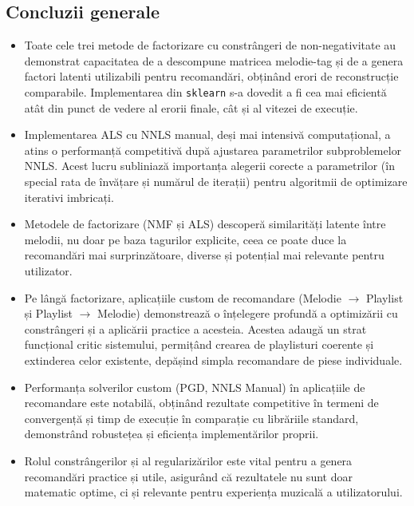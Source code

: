 \documentclass[12pt,a4paper]{article}
\begin{document}
	\subsection{Concluzii generale}
	\begin{itemize}
		\item Toate cele trei metode de factorizare cu constrângeri de non-negativitate au demonstrat capacitatea de a descompune matricea melodie-tag și de a genera factori latenti utilizabili pentru recomandări, obținând erori de reconstrucție comparabile. Implementarea din \texttt{sklearn} s-a dovedit a fi cea mai eficientă atât din punct de vedere al erorii finale, cât și al vitezei de execuție.
		\item Implementarea ALS cu NNLS manual, deși mai intensivă computațional, a atins o performanță competitivă după ajustarea parametrilor subproblemelor NNLS. Acest lucru subliniază importanța alegerii corecte a parametrilor (în special rata de învățare și numărul de iterații) pentru algoritmii de optimizare iterativi imbricați.
		\item Metodele de factorizare (NMF și ALS) descoperă similarități latente între melodii, nu doar pe baza tagurilor explicite, ceea ce poate duce la recomandări mai surprinzătoare, diverse și potențial mai relevante pentru utilizator.
		\item Pe lângă factorizare, aplicațiile custom de recomandare (Melodie $\rightarrow$ Playlist și Playlist $\rightarrow$ Melodie) demonstrează o înțelegere profundă a optimizării cu constrângeri și a aplicării practice a acesteia. Acestea adaugă un strat funcțional critic sistemului, permițând crearea de playlisturi coerente și extinderea celor existente, depășind simpla recomandare de piese individuale.
		\item Performanța solverilor custom (PGD, NNLS Manual) în aplicațiile de recomandare este notabilă, obținând rezultate competitive în termeni de convergență și timp de execuție în comparație cu librăriile standard, demonstrând robustețea și eficiența implementărilor proprii.
		\item Rolul constrângerilor și al regularizărilor este vital pentru a genera recomandări practice și utile, asigurând că rezultatele nu sunt doar matematic optime, ci și relevante pentru experiența muzicală a utilizatorului.
	\end{itemize}
\end{document}

